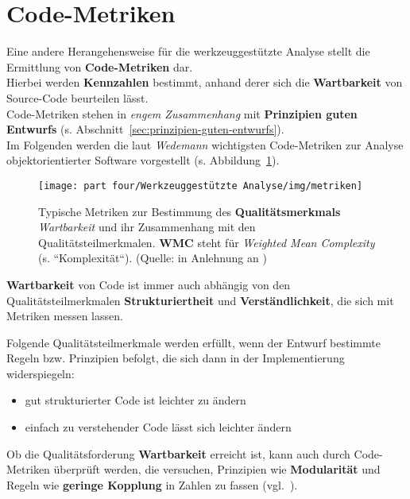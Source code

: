 \section{Code-Metriken}
Eine andere Herangehensweise für die werkzeuggestützte Analyse stellt die Ermittlung von \textbf{Code-Metriken} dar.\\
Hierbei werden \textbf{Kennzahlen} bestimmt, anhand derer sich die \textbf{Wartbarkeit} von Source-Code beurteilen lässt.\\
Code-Metriken stehen in \textit{engem Zusammenhang} mit \textbf{Prinzipien guten Entwurfs} (s. Abschnitt~\ref{sec:prinzipien-guten-entwurfs}).\\
Im Folgenden werden die laut \textit{Wedemann} wichtigsten Code-Metriken zur Analyse objektorientierter Software vorgestellt (s. Abbildung~\ref{fig:metriken}).

\begin{figure}
    \centering
    \texttt{[image: part four/Werkzeuggestützte Analyse/img/metriken]}
    \caption{Typische Metriken zur Bestimmung des \textbf{Qualitätsmerkmals} \textit{Wartbarkeit} und ihr Zusammenhang mit den Qualitätsteilmerkmalen. \textbf{WMC} steht für  \textit{Weighted Mean Complexity} (s. ``Komplexität``). (Quelle: in Anlehnung an \cite[Abb. 4.3, 37]{Wed09c})}
    \label{fig:metriken}
\end{figure}

\begin{tcolorbox}[colback=white]
    \textbf{Wartbarkeit} von Code ist immer auch abhängig von den Qualitätsteilmerkmalen \textbf{Strukturiertheit} und \textbf{Verständlichkeit}, die sich mit Metriken messen lassen.\\
\end{tcolorbox}
\vspace{2mm}

\noindent
Folgende Qualitätsteilmerkmale werden erfüllt, wenn der Entwurf bestimmte Regeln bzw. Prinzipien befolgt, die sich dann in der Implementierung widerspiegeln:

\begin{itemize}
    \item gut strukturierter Code ist leichter zu ändern
    \item einfach zu verstehender Code lässt sich leichter ändern
\end{itemize}

\begin{tcolorbox}
    Ob die Qualitätsforderung \textbf{Wartbarkeit} erreicht ist, kann auch durch Code-Metriken überprüft werden, die versuchen, Prinzipien wie \textbf{Modularität} und Regeln wie \textbf{geringe Kopplung} in Zahlen zu fassen (vgl.~\cite[38]{Wed09c}).
\end{tcolorbox}
\vspace{2mm}

